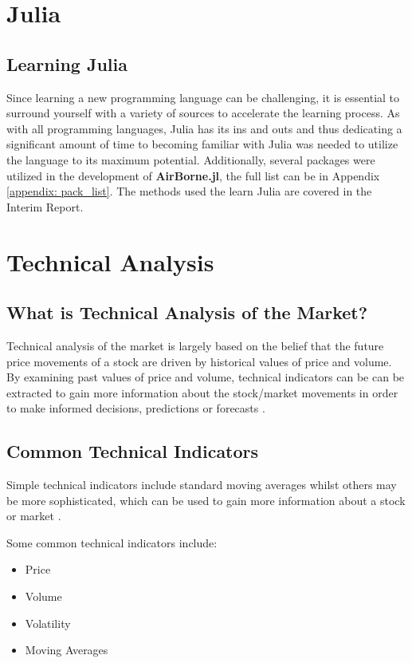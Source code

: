 \section{Julia}
\subsection{Learning Julia}
Since learning a new programming language can be challenging, it is essential to surround yourself with a variety of sources to accelerate the learning process. As with all programming languages, Julia has its ins and outs and thus dedicating a significant amount of time to becoming familiar with Julia was needed to utilize the language to its maximum potential. Additionally, several packages were utilized in the development of \textbf{AirBorne.jl}, the full list can be in Appendix \ref{appendix: pack_list}. The methods used the learn Julia are covered in the Interim Report.

\section{Technical Analysis}
\subsection{What is Technical Analysis of the Market?}

\noindent Technical analysis of the market is largely based on the belief that the future price movements of a stock are driven by historical values of price and volume. By examining past values of price and volume, technical indicators can be can be extracted to gain more information about the stock/market movements in order to make informed decisions, predictions or forecasts \cite{tech_analysis}. 

\subsection{Common Technical Indicators}
\label{subsection: comm_t_ind}

\noindent Simple technical indicators include standard moving averages whilst others may be more sophisticated, which can be used to gain more information about a stock or market \cite{tech_indic}.  

\noindent Some common technical indicators include:

\begin{itemize}
    \item Price
    \item Volume
    \item Volatility
    \item Moving Averages
\end{itemize}

